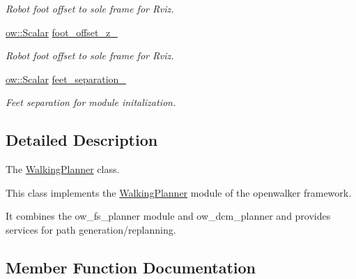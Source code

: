 \begin{DoxyCompactItemize}
\begin{DoxyCompactList}\small\item\em Robot foot offset to sole frame for Rviz. \end{DoxyCompactList}\item 
\hyperlink{types_8h_ac412879ee4a239c8032aa2d647f4a74a}{ow\+::\+Scalar} \hyperlink{classow__planner_1_1WalkingPlanner_a11fc2f73e55193345c1314af4e056e2a}{foot\+\_\+offset\+\_\+z\+\_\+}\hypertarget{classow__planner_1_1WalkingPlanner_a11fc2f73e55193345c1314af4e056e2a}{}\label{classow__planner_1_1WalkingPlanner_a11fc2f73e55193345c1314af4e056e2a}

\begin{DoxyCompactList}\small\item\em Robot foot offset to sole frame for Rviz. \end{DoxyCompactList}\item 
\hyperlink{types_8h_ac412879ee4a239c8032aa2d647f4a74a}{ow\+::\+Scalar} \hyperlink{classow__planner_1_1WalkingPlanner_afd99363bc7a809470f3766ccb260339c}{feet\+\_\+separation\+\_\+}\hypertarget{classow__planner_1_1WalkingPlanner_afd99363bc7a809470f3766ccb260339c}{}\label{classow__planner_1_1WalkingPlanner_afd99363bc7a809470f3766ccb260339c}

\begin{DoxyCompactList}\small\item\em Feet separation for module initalization. \end{DoxyCompactList}\end{DoxyCompactItemize}


\subsection{Detailed Description}
The \hyperlink{classow__planner_1_1WalkingPlanner}{Walking\+Planner} class. 

This class implements the \hyperlink{classow__planner_1_1WalkingPlanner}{Walking\+Planner} module of the openwalker framework.

It combines the ow\+\_\+fs\+\_\+planner module and ow\+\_\+dcm\+\_\+planner and provides services for path generation/replanning. 

\subsection{Member Function Documentation}

